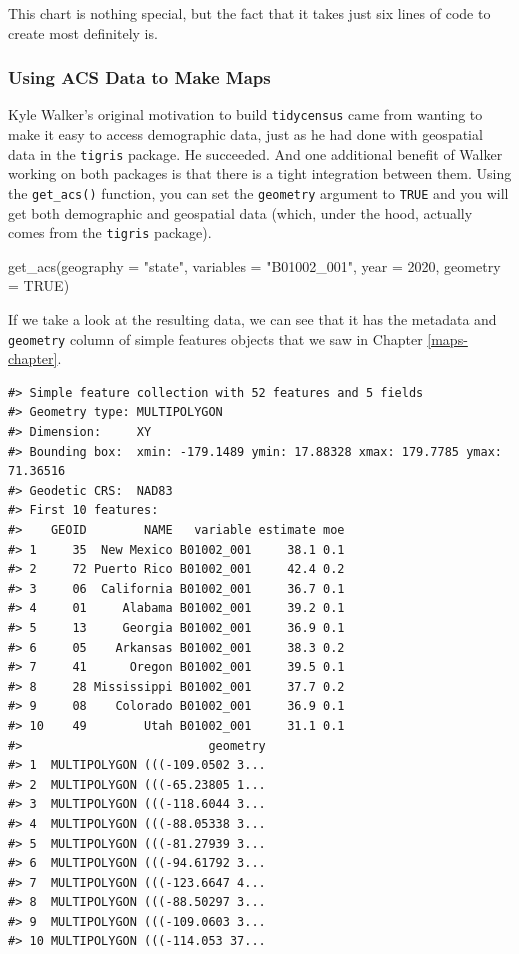 \documentclass[
]{book}
\newenvironment{Shaded}{\begin{snugshade}}{\end{snugshade}}
\newcommand{\AttributeTok}[1]{\textcolor[rgb]{0.77,0.63,0.00}{#1}}
\newcommand{\ConstantTok}[1]{\textcolor[rgb]{0.00,0.00,0.00}{#1}}
\newcommand{\DecValTok}[1]{\textcolor[rgb]{0.00,0.00,0.81}{#1}}
\newcommand{\FunctionTok}[1]{\textcolor[rgb]{0.00,0.00,0.00}{#1}}
\newcommand{\NormalTok}[1]{#1}
\newcommand{\StringTok}[1]{\textcolor[rgb]{0.31,0.60,0.02}{#1}}
\begin{document}
This chart is nothing special, but the fact that it takes just six lines of code to create most definitely is.

\hypertarget{using-acs-data-to-make-maps}{%
\subsubsection*{Using ACS Data to Make Maps}\label{using-acs-data-to-make-maps}}

Kyle Walker's original motivation to build \texttt{tidycensus} came from wanting to make it easy to access demographic data, just as he had done with geospatial data in the \texttt{tigris} package. He succeeded. And one additional benefit of Walker working on both packages is that there is a tight integration between them. Using the \texttt{get\_acs()} function, you can set the \texttt{geometry} argument to \texttt{TRUE} and you will get both demographic and geospatial data (which, under the hood, actually comes from the \texttt{tigris} package).

\begin{Shaded}
\begin{Highlighting}[]
\FunctionTok{get\_acs}\NormalTok{(}\AttributeTok{geography =} \StringTok{"state"}\NormalTok{,}
        \AttributeTok{variables =} \StringTok{"B01002\_001"}\NormalTok{,}
        \AttributeTok{year =} \DecValTok{2020}\NormalTok{,}
        \AttributeTok{geometry =} \ConstantTok{TRUE}\NormalTok{) }
\end{Highlighting}
\end{Shaded}

If we take a look at the resulting data, we can see that it has the metadata and \texttt{geometry} column of simple features objects that we saw in Chapter \ref{maps-chapter}.

\begin{verbatim}
#> Simple feature collection with 52 features and 5 fields
#> Geometry type: MULTIPOLYGON
#> Dimension:     XY
#> Bounding box:  xmin: -179.1489 ymin: 17.88328 xmax: 179.7785 ymax: 71.36516
#> Geodetic CRS:  NAD83
#> First 10 features:
#>    GEOID        NAME   variable estimate moe
#> 1     35  New Mexico B01002_001     38.1 0.1
#> 2     72 Puerto Rico B01002_001     42.4 0.2
#> 3     06  California B01002_001     36.7 0.1
#> 4     01     Alabama B01002_001     39.2 0.1
#> 5     13     Georgia B01002_001     36.9 0.1
#> 6     05    Arkansas B01002_001     38.3 0.2
#> 7     41      Oregon B01002_001     39.5 0.1
#> 8     28 Mississippi B01002_001     37.7 0.2
#> 9     08    Colorado B01002_001     36.9 0.1
#> 10    49        Utah B01002_001     31.1 0.1
#>                          geometry
#> 1  MULTIPOLYGON (((-109.0502 3...
#> 2  MULTIPOLYGON (((-65.23805 1...
#> 3  MULTIPOLYGON (((-118.6044 3...
#> 4  MULTIPOLYGON (((-88.05338 3...
#> 5  MULTIPOLYGON (((-81.27939 3...
#> 6  MULTIPOLYGON (((-94.61792 3...
#> 7  MULTIPOLYGON (((-123.6647 4...
#> 8  MULTIPOLYGON (((-88.50297 3...
#> 9  MULTIPOLYGON (((-109.0603 3...
#> 10 MULTIPOLYGON (((-114.053 37...
\end{verbatim}
\end{document}
